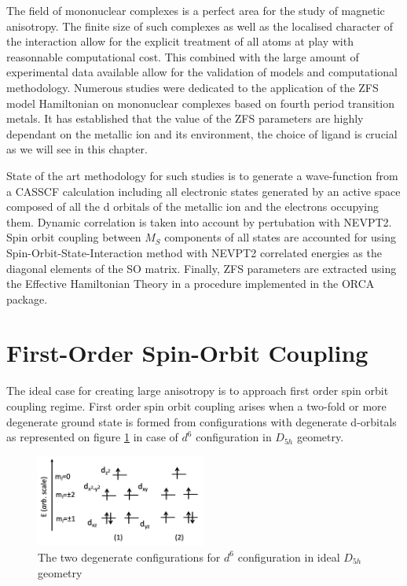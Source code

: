 \documentclass[10pt]{report}
\numberwithin{equation}{section}
\begin{document}
The field of mononuclear complexes is a perfect area for the study of magnetic anisotropy. 
The finite size of such complexes as well as the localised character of the interaction allow for the explicit treatment of all atoms at play with reasonnable computational cost.
This combined with the large amount of experimental data available allow for the validation of models and computational methodology.
Numerous studies were dedicated to the application of the ZFS model Hamiltonian on mononuclear complexes based on fourth period transition metals.
It has established that the value of the ZFS parameters are highly dependant on the metallic ion and its environment, the choice of ligand is crucial as we will see in this chapter.
\par State of the art methodology for such studies is to generate a wave-function from a CASSCF calculation including all electronic states generated by an active space composed of all the d orbitals of the metallic ion and the electrons occupying them. 
Dynamic correlation is taken into account by pertubation with NEVPT2. 
Spin orbit coupling between $M_S$ components of all states are accounted for using Spin-Orbit-State-Interaction method with NEVPT2 correlated energies as the diagonal elements of the SO matrix.
Finally, ZFS parameters are extracted using the Effective Hamiltonian Theory in a procedure implemented in the ORCA package.

\section{First-Order Spin-Orbit Coupling}

The ideal case for creating large anisotropy is to approach first order spin orbit coupling regime. 
First order spin orbit coupling arises when a two-fold or more degenerate ground state is formed from configurations with degenerate d-orbitals as represented on figure \ref{Fer_config} in case of $d^6$ configuration in $D_{5h}$ geometry.

\begin{figure}[h!]
    \centering
    \includegraphics[width=0.5\textwidth]{Images/DiagOrbFed6.png}
    \caption{The two degenerate configurations for $d^6$ configuration in ideal $D_{5h}$ geometry}
    \label{Fer_config}
\end{figure}
\end{document}
